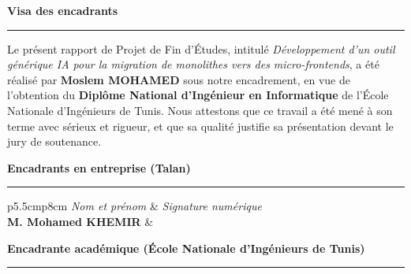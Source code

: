 \providecommand{\ReportTitle}{Développement d'un outil générique IA pour la migration de monolithes vers des micro-frontends}
\providecommand{\AuthorName}{Moslem MOHAMED}
\providecommand{\Degree}{Diplôme National d'Ingénieur en Informatique}
\providecommand{\School}{École Nationale d'Ingénieurs de Tunis}
\providecommand{\Company}{Talan}
\providecommand{\SupervisorOne}{M. Mohamed KHEMIR}
\providecommand{\SupervisorTwo}{}
\providecommand{\SupervisorThree}{}
\providecommand{\SchoolSupervisor}{Mme. Mariem ZAOUALI}

\begin{Form}
\begin{titlepage}
\thispagestyle{empty}
 
\vspace*{0.6cm}
\begin{center}
{\Large \textbf{Visa des encadrants}}\\[0.3cm]
\rule{0.45\textwidth}{0.6pt}
\end{center}
 
\vspace{0.6cm}
 
\noindent
Le présent rapport de Projet de Fin d'Études, intitulé
\og{}\textit{\ReportTitle}\fg{}, a été réalisé par
\textbf{\AuthorName} sous notre encadrement, en vue de l'obtention du
\textbf{\Degree} de l'\School. Nous attestons que ce travail a été mené
à son terme avec sérieux et rigueur, et que sa qualité justifie sa
présentation devant le jury de soutenance.
 
\vspace{1.0cm}
 
\noindent\textbf{Encadrants en entreprise \quad(\Company)}\\[0.15cm]
\rule{\linewidth}{0.4pt}
 
\vspace{0.2cm}
 
\renewcommand{\arraystretch}{2.2}
\noindent
\begin{tabular}{p{5.5cm}p{8cm}}
\textit{Nom et prénom} & \textit{Signature numérique} \\
\textbf{\SupervisorOne}   & \TextField[name=sig_sup_1, width=7.5cm, height=28pt, bordercolor=0.6 0.6 0.6, borderwidth=0.4, backgroundcolor=0.97 0.97 0.97, multiline=true]{} \\
\end{tabular}
 
\vspace{0.6cm}
 
\noindent\textbf{Encadrante académique \quad(\School)}\\[0.15cm]
\rule{\linewidth}{0.4pt}
 

\end{titlepage}
\end{Form}
